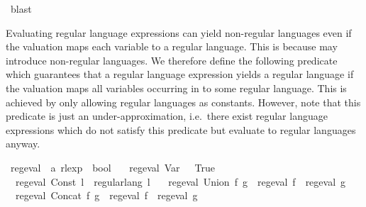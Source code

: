 \begin{isabellebody}
\ blast\isanewline
{}\isamarkupfalse%
%
\endisatagproof
{\isafoldproof}%
%
\isadelimproof
%
\endisadelimproof
%
\isadelimdocument
%
\endisadelimdocument
%
\isatagdocument
%
\isamarkuptrue%
%
\endisatagdocument
{\isafolddocument}%
%
\isadelimdocument
%
\endisadelimdocument
%
\begin{isamarkuptext}%
Evaluating regular language expressions can yield non-regular languages even if
the valuation maps each variable to a regular language. This is because  may introduce
non-regular languages.
We therefore define the following predicate which guarantees that a regular language expression
 yields a regular language if the valuation maps all variables occurring in  to some regular
language. This is achieved by only allowing regular languages as constants.
However, note that this predicate is just an under-approximation, i.e.\ there exist regular language
expressions which do not satisfy this predicate but evaluate to regular languages anyway.%
\end{isamarkuptext}\isamarkuptrue%
\isamarkupfalse%
\ reg{\isacharunderscore}{\kern0pt}eval\ {\isacharcolon}{\kern0pt}{\isacharcolon}{\kern0pt}\ {\isachardoublequoteopen}{\isacharprime}{\kern0pt}a\ rlexp\ {\isasymRightarrow}\ bool{\isachardoublequoteclose}\ \isanewline
\ \ {\isachardoublequoteopen}reg{\isacharunderscore}{\kern0pt}eval\ {\isacharparenleft}{\kern0pt}Var\ {\isacharunderscore}{\kern0pt}{\isacharparenright}{\kern0pt}\ {\isasymlongleftrightarrow}\ True{\isachardoublequoteclose}\ {\isacharbar}{\kern0pt}\isanewline
\ \ {\isachardoublequoteopen}reg{\isacharunderscore}{\kern0pt}eval\ {\isacharparenleft}{\kern0pt}Const\ l{\isacharparenright}{\kern0pt}\ {\isasymlongleftrightarrow}\ regular{\isacharunderscore}{\kern0pt}lang\ l{\isachardoublequoteclose}\ {\isacharbar}{\kern0pt}\isanewline
\ \ {\isachardoublequoteopen}reg{\isacharunderscore}{\kern0pt}eval\ {\isacharparenleft}{\kern0pt}Union\ f\ g{\isacharparenright}{\kern0pt}\ {\isasymlongleftrightarrow}\ reg{\isacharunderscore}{\kern0pt}eval\ f\ {\isasymand}\ reg{\isacharunderscore}{\kern0pt}eval\ g{\isachardoublequoteclose}\ {\isacharbar}{\kern0pt}\isanewline
\ \ {\isachardoublequoteopen}reg{\isacharunderscore}{\kern0pt}eval\ {\isacharparenleft}{\kern0pt}Concat\ f\ g{\isacharparenright}{\kern0pt}\ {\isasymlongleftrightarrow}\ reg{\isacharunderscore}{\kern0pt}eval\ f\ {\isasymand}\ reg{\isacharunderscore}{\kern0pt}eval\ g{\isachardoublequoteclose}\ {\isacharbar}{\kern0pt}\isanewline

\end{isabellebody}
